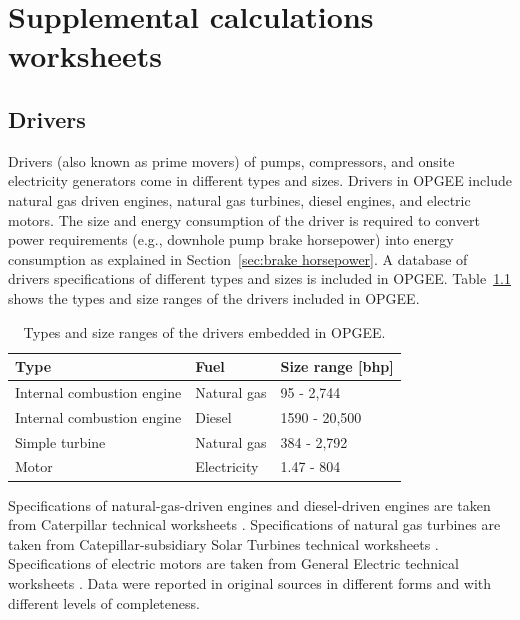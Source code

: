 \documentclass[11pt]{report}
\begin{document}
\clearpage


\chapter{Supplemental calculations worksheets}


\section{Drivers} \label{sec:drivers}

Drivers (also known as prime movers) of pumps, compressors, and onsite electricity generators come in different types and sizes. Drivers in OPGEE include natural gas driven engines, natural gas turbines, diesel engines, and electric motors. The size and energy consumption of the driver is required to convert power requirements (e.g., downhole pump brake horsepower) into energy consumption as explained in Section \,\ref{sec:brake horsepower}. A database of drivers specifications of different types and sizes is included in OPGEE. Table \,\ref{tab:drivers_size} shows the types and size ranges of the drivers included in OPGEE.
\begin{table}
\begin{scriptsize}
\caption{Types and size ranges of the drivers embedded in OPGEE.}
\label{tab:drivers_size}
\begin{tabular*}{1\columnwidth}{p{}p{}p{}}
\toprule
Type & Fuel & Size range [bhp] \\
\midrule
Internal combustion engine & Natural gas & 95 - 2,744 \\
Internal combustion engine & Diesel & 1590 - 20,500 \\
Simple turbine & Natural gas & 384 - 2,792 \\
Motor & Electricity & 1.47 - 804 \\
\bottomrule
\end{tabular*}
\end{scriptsize}
\end{table}

Specifications of natural-gas-driven engines and diesel-driven engines are taken from Caterpillar technical worksheets \cite{Caterpillar2012}. Specifications of natural gas turbines are taken from Catepillar-subsidiary Solar Turbines technical worksheets \cite{Solarturbines2012}. Specifications of electric motors are taken from General Electric technical worksheets \cite{GE2011}. Data were reported in original sources in different forms and with different levels of completeness.
\end{document}

